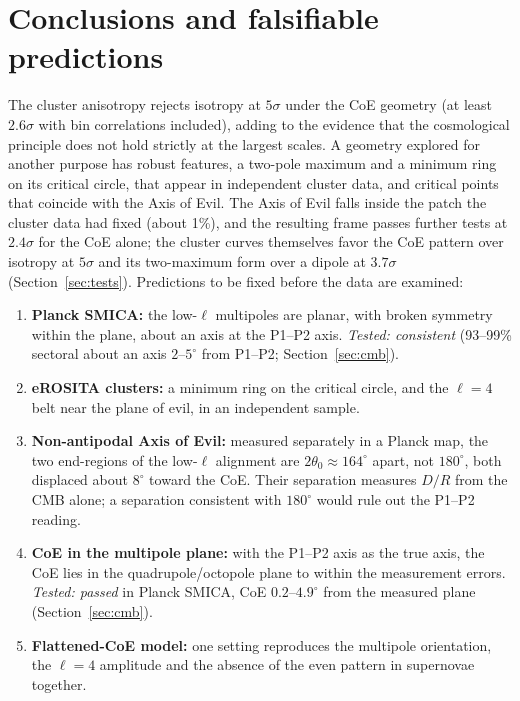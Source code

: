 \documentclass[11pt,a4paper]{article}
\newcommand{\dg}{^\circ}
\begin{document}
\section{Conclusions and falsifiable predictions}\label{sec:concl}
The cluster anisotropy rejects isotropy at $5\sigma$ under the CoE geometry (at least $2.6\sigma$ with bin correlations included), adding to the evidence that the cosmological principle does not hold strictly at the largest scales. A geometry explored for another purpose has robust features, a two-pole maximum and a minimum ring on its critical circle, that appear in independent cluster data, and critical points that coincide with the Axis of Evil. The Axis of Evil falls inside the patch the cluster data had fixed (about 1\%), and the resulting frame passes further tests at $2.4\sigma$ for the CoE alone; the cluster curves themselves favor the CoE pattern over isotropy at $5\sigma$ and its two-maximum form over a dipole at $3.7\sigma$ (Section~\ref{sec:tests}). Predictions to be fixed before the data are examined:
\begin{enumerate}\setlength\itemsep{1pt}
\item \textbf{Planck SMICA:} the low-$\ell$ multipoles are planar, with broken symmetry within the plane, about an axis at the P1--P2 axis. \emph{Tested: consistent} (93--99\% sectoral about an axis $2$--$5\dg$ from P1--P2; Section~\ref{sec:cmb}).
\item \textbf{eROSITA clusters:} a minimum ring on the critical circle, and the $\ell=4$ belt near the plane of evil, in an independent sample.
\item \textbf{Non-antipodal Axis of Evil:} measured separately in a Planck map, the two end-regions of the low-$\ell$ alignment are $2\theta_0\approx164\dg$ apart, not $180\dg$, both displaced about $8\dg$ toward the CoE. Their separation measures $D/R$ from the CMB alone; a separation consistent with $180\dg$ would rule out the P1--P2 reading.
\item \textbf{CoE in the multipole plane:} with the P1--P2 axis as the true axis, the CoE lies in the quadrupole/octopole plane to within the measurement errors. \emph{Tested: passed} in Planck SMICA, CoE $0.2$--$4.9\dg$ from the measured plane (Section~\ref{sec:cmb}).
\item \textbf{Flattened-CoE model:} one setting reproduces the multipole orientation, the $\ell=4$ amplitude and the absence of the even pattern in supernovae together.
\end{enumerate}
\end{document}
